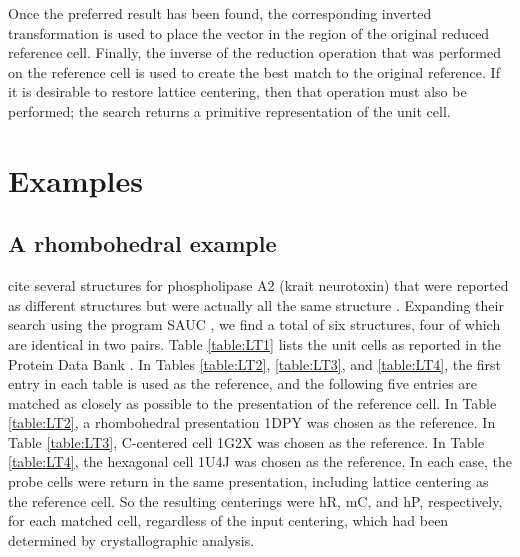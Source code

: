 \documentclass[preprint]{iucr}              %
\numberwithin{equation}{section}
\numberwithin{equation}{section}
\begin{document}
	Once the preferred result has been found, the corresponding inverted transformation is used
	to place the vector in the region of the original reduced reference cell. Finally, the inverse of the reduction
	operation that was performed on the reference cell is used to create the best match
	to the original reference. If it is desirable to restore lattice centering, then that operation must also  be
	performed; the search returns a primitive representation
	of the unit cell.
	
	\section{Examples}
	\subsection{A rhombohedral example}
	 cite several structures for phospholipase A2 (krait neurotoxin) that were reported as 
	different structures but were actually all the same structure \cite{bernstein2020}. Expanding their search using the program SAUC 
	\cite{mcgill2014},
	we find a total of six structures, four of which are identical in 
	two pairs. Table \ref{table:LT1} lists the unit cells as reported in the Protein
	Data Bank \cite{Bernstein1977} \cite{Berman2000}. In Tables \ref{table:LT2}, \ref{table:LT3}, and \ref{table:LT4}, the first
	entry in each table is used as the reference, and the following five entries are matched as 
	closely as possible to the presentation of the reference cell. In Table \ref{table:LT2}, a
	rhombohedral presentation 1DPY was chosen as the reference. In Table \ref{table:LT3},
	C-centered cell 1G2X was chosen as the reference. In Table \ref{table:LT4}, the hexagonal cell 1U4J
	was chosen as the reference. In each case, the probe cells
	were return in the same presentation, including lattice 
	centering as the reference cell. So the resulting centerings
	were hR, mC, and hP, respectively, for each matched cell,
	regardless of the input centering, which had been determined
	by crystallographic analysis.
	~~\\
	
\end{document}
